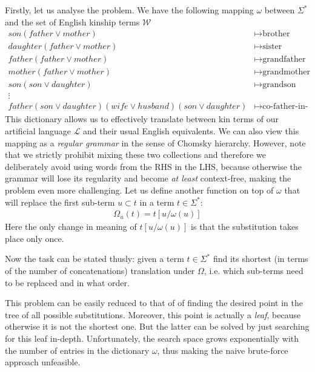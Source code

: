     Firstly, let us analyse the problem. We have the following mapping $\omega$ between $\Sigma^*$ and the set of English kinship terms
    $\mathcal{W}$
    \begin{align*}
        son(father \vee mother) &\mapsto \text{brother}\\
        daughter(father \vee mother) &\mapsto \text{sister}\\
        father(father \vee mother) &\mapsto \text{grandfather}\\
        mother(father \vee mother) &\mapsto \text{grandmother}\\
        son(son \vee daughter) &\mapsto \text{grandson}\\
        \vdots\\
        father(son \vee daughter)(wife \vee husband)(son \vee daughter) &\mapsto \text{co-father-in-law}
    \end{align*}
    This dictionary allows us to effectively translate between kin terms of our artificial language $\mathcal{L}$ and their usual
    English equivalents. We can also view this mapping as a \textit{regular grammar} in the sense of Chomsky hierarchy\cite{chomsky}.
    However, note that we strictly prohibit mixing these two collections and therefore we deliberately avoid
    using words from the RHS in the LHS, because otherwise the grammar will lose its regularity and become \textit{at least}
    context-free, making the problem even more challenging. Let us define another function on top of $\omega$ that will replace the
    first sub-term $u \subset t$ in a term $t \in \Sigma^*$:
    \begin{align*}
        \Omega_u(t) = t[u / \omega(u)]
    \end{align*}
    Here the only change in meaning of $t[u / \omega(u)]$ is that the substitution takes place only once.

    Now the task can be stated thusly: given a term $t \in \Sigma^*$ find its shortest (in terms of the number of concatenations)
    translation under $\Omega$, i.e. which sub-terms need to be replaced and in what order.

    This problem can be easily reduced to that of of finding the desired point in the tree of all possible
    substitutions. Moreover, this point is actually a \textit{leaf}, because otherwise it is not the shortest one. But the latter
    can be solved by just searching for this leaf in-depth. Unfortunately, the search space grows exponentially with the
    number of entries in the dictionary $\omega$, thus making the naive brute-force approach unfeasible.

